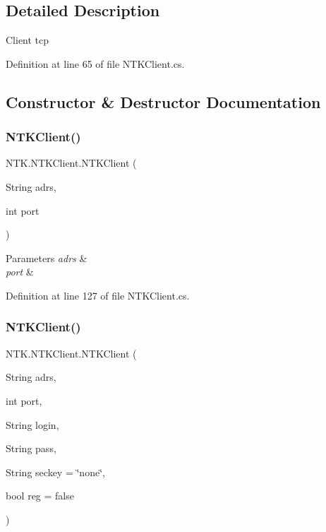 \subsection{Detailed Description}
Client tcp 



Definition at line 65 of file N\+T\+K\+Client.\+cs.



\subsection{Constructor \& Destructor Documentation}
\mbox{\label{class_n_t_k_1_1_n_t_k_client_ae6350ba62e1ba3e2e5af88dc629897c8}} 
\subsubsection{\texorpdfstring{NTKClient()}{NTKClient()}\hspace{0.1cm}{\footnotesize\ttfamily [1/2]}}
{\footnotesize\ttfamily N\+T\+K.\+N\+T\+K\+Client.\+N\+T\+K\+Client (\begin{DoxyParamCaption}\item[{String}]{adrs,  }\item[{int}]{port }\end{DoxyParamCaption})}






\begin{DoxyParams}{Parameters}
{\em adrs} & \\
\hline
{\em port} & \\
\hline
\end{DoxyParams}


Definition at line 127 of file N\+T\+K\+Client.\+cs.

\mbox{\label{class_n_t_k_1_1_n_t_k_client_ab8d8eff12fc192d9a9c3aca7aa62b059}} 
\subsubsection{\texorpdfstring{NTKClient()}{NTKClient()}\hspace{0.1cm}{\footnotesize\ttfamily [2/2]}}
{\footnotesize\ttfamily N\+T\+K.\+N\+T\+K\+Client.\+N\+T\+K\+Client (\begin{DoxyParamCaption}\item[{String}]{adrs,  }\item[{int}]{port,  }\item[{String}]{login,  }\item[{String}]{pass,  }\item[{String}]{seckey = {\ttfamily \char`\"{}none\char`\"{}},  }\item[{bool}]{reg = {\ttfamily false} }\end{DoxyParamCaption})}






